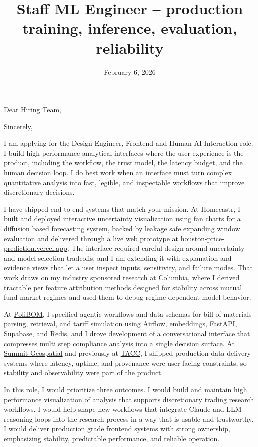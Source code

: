 \documentclass[letterpaper, 10pt,colorlinks,linkcolor=cyan]{moderncv}
\title{\large Staff ML Engineer -- production training, inference, evaluation, reliability}
\begin{document}
  \hypersetup{urlcolor=links}
  \makecvtitle

  \date{February 6, 2026}
  \opening{Dear Hiring Team,}
  \closing{Sincerely,}
  \makelettertitle

I am applying for the Design Engineer, Frontend and Human AI Interaction role. I build high performance analytical interfaces where the user experience is the product, including the workflow, the trust model, the latency budget, and the human decision loop. I do best work when an interface must turn complex quantitative analysis into fast, legible, and inspectable workflows that improve discretionary decisions.

I have shipped end to end systems that match your mission. At Homecastr, I built and deployed interactive uncertainty visualization using fan charts for a diffusion based forecasting system, backed by leakage safe expanding window evaluation and delivered through a live web prototype at \href{https://houston-price-prediction.vercel.app}{houston-price-prediction.vercel.app}. The interface required careful design around uncertainty and model selection tradeoffs, and I am extending it with explanation and evidence views that let a user inspect inputs, sensitivity, and failure modes. That work draws on my industry sponsored research at Columbia, where I derived tractable per feature attribution methods designed for stability across mutual fund market regimes and used them to debug regime dependent model behavior.

At \href{https://polibom.com}{PoliBOM}, I specified agentic workflows and data schemas for bill of materials parsing, retrieval, and tariff simulation using Airflow, embeddings, FastAPI, Supabase, and Redis, and I drove development of a conversational interface that compresses multi step compliance analysis into a single decision surface. At \href{https://summitgeospatial.com}{Summit Geospatial} and previously at \href{https://tacc.utexas.edu}{TACC}, I shipped production data delivery systems where latency, uptime, and provenance were user facing constraints, so stability and observability were part of the product.

In this role, I would prioritize three outcomes. I would build and maintain high performance visualization of analysis that supports discretionary trading research workflows. I would help shape new workflows that integrate Claude and LLM reasoning loops into the research process in a way that is usable and trustworthy. I would deliver production grade frontend systems with strong ownership, emphasizing stability, predictable performance, and reliable operation.
\end{document}
